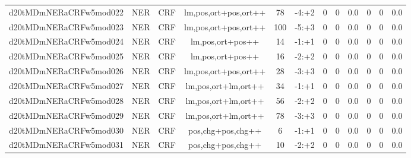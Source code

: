 \documentclass[a4paper]{article}
\begin{document}
\begin{landscape}
\begin{center}
\begin{tabular}{ |c|c|c|c|c|c|c|c|c|c|c|c|}
 
 	
 	\small{ d20tMDmNERaCRFw5mod022 } & \small{ NER} & \small{  CRF }  & lm,pos,ort+pos,ort++  &  78 &  \small{  -4:+2 }  &  0 & 0 & 0.0  &  0 & 0 & 0.0 \\
 	

 
 	
 	\small{ d20tMDmNERaCRFw5mod023 } & \small{ NER} & \small{  CRF }  & lm,pos,ort+pos,ort++  &  100 &  \small{  -5:+3 }  &  0 & 0 & 0.0  &  0 & 0 & 0.0 \\
 	

 
 	
 	\small{ d20tMDmNERaCRFw5mod024 } & \small{ NER} & \small{  CRF }  & lm,pos,ort+pos++  &  14 &  \small{  -1:+1 }  &  0 & 0 & 0.0  &  0 & 0 & 0.0 \\
 	

 
 	
 	\small{ d20tMDmNERaCRFw5mod025 } & \small{ NER} & \small{  CRF }  & lm,pos,ort+pos++  &  16 &  \small{  -2:+2 }  &  0 & 0 & 0.0  &  0 & 0 & 0.0 \\
 	

 
 	
 	\small{ d20tMDmNERaCRFw5mod026 } & \small{ NER} & \small{  CRF }  & lm,pos,ort+pos,ort++  &  28 &  \small{  -3:+3 }  &  0 & 0 & 0.0  &  0 & 0 & 0.0 \\
 	

 
 	
 	\small{ d20tMDmNERaCRFw5mod027 } & \small{ NER} & \small{  CRF }  & lm,pos,ort+lm,ort++  &  34 &  \small{  -1:+1 }  &  0 & 0 & 0.0  &  0 & 0 & 0.0 \\
 	

 
 	
 	\small{ d20tMDmNERaCRFw5mod028 } & \small{ NER} & \small{  CRF }  & lm,pos,ort+lm,ort++  &  56 &  \small{  -2:+2 }  &  0 & 0 & 0.0  &  0 & 0 & 0.0 \\
 	

 
 	
 	\small{ d20tMDmNERaCRFw5mod029 } & \small{ NER} & \small{  CRF }  & lm,pos,ort+lm,ort++  &  78 &  \small{  -3:+3 }  &  0 & 0 & 0.0  &  0 & 0 & 0.0 \\
 	

 
 	
 	\small{ d20tMDmNERaCRFw5mod030 } & \small{ NER} & \small{  CRF }  & pos,chg+pos,chg++  &  6 &  \small{  -1:+1 }  &  0 & 0 & 0.0  &  0 & 0 & 0.0 \\
 	

 
 	
 	\small{ d20tMDmNERaCRFw5mod031 } & \small{ NER} & \small{  CRF }  & pos,chg+pos,chg++  &  10 &  \small{  -2:+2 }  &  0 & 0 & 0.0  &  0 & 0 & 0.0 \\
 	

\end{tabular}
\end{center}
\end{landscape}
\end{document}
